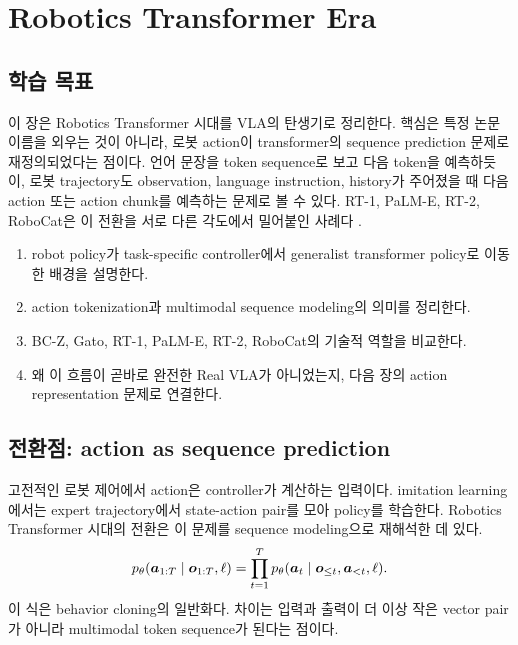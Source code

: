 \chapter{Robotics Transformer Era}

\section*{학습 목표}

이 장은 Robotics Transformer 시대를 VLA의 탄생기로 정리한다. 핵심은 특정 논문 이름을 외우는 것이 아니라, 로봇 action이 transformer의 sequence prediction 문제로 재정의되었다는 점이다. 언어 문장을 token sequence로 보고 다음 token을 예측하듯이, 로봇 trajectory도 observation, language instruction, history가 주어졌을 때 다음 action 또는 action chunk를 예측하는 문제로 볼 수 있다. RT-1, PaLM-E, RT-2, RoboCat은 이 전환을 서로 다른 각도에서 밀어붙인 사례다 \cite{rt12022,palme2023,rt22023,robocat2023}.

\begin{enumerate}
  \item robot policy가 task-specific controller에서 generalist transformer policy로 이동한 배경을 설명한다.
  \item action tokenization과 multimodal sequence modeling의 의미를 정리한다.
  \item BC-Z, Gato, RT-1, PaLM-E, RT-2, RoboCat의 기술적 역할을 비교한다.
  \item 왜 이 흐름이 곧바로 완전한 Real VLA가 아니었는지, 다음 장의 action representation 문제로 연결한다.
\end{enumerate}

\section{전환점: action as sequence prediction}

고전적인 로봇 제어에서 action은 controller가 계산하는 입력이다. imitation learning에서는 expert trajectory에서 state-action pair를 모아 policy를 학습한다. Robotics Transformer 시대의 전환은 이 문제를 sequence modeling으로 재해석한 데 있다.
\begin{equation}
  p_{\theta}(\bm{a}_{1:T} \mid \bm{o}_{1:T},\ell)
  =
  \prod_{t=1}^{T}
  p_{\theta}(\bm{a}_t \mid \bm{o}_{\leq t},\bm{a}_{<t},\ell).
  \label{eq:robot-sequence-model}
\end{equation}
이 식은 behavior cloning의 일반화다. 차이는 입력과 출력이 더 이상 작은 vector pair가 아니라 multimodal token sequence가 된다는 점이다.

